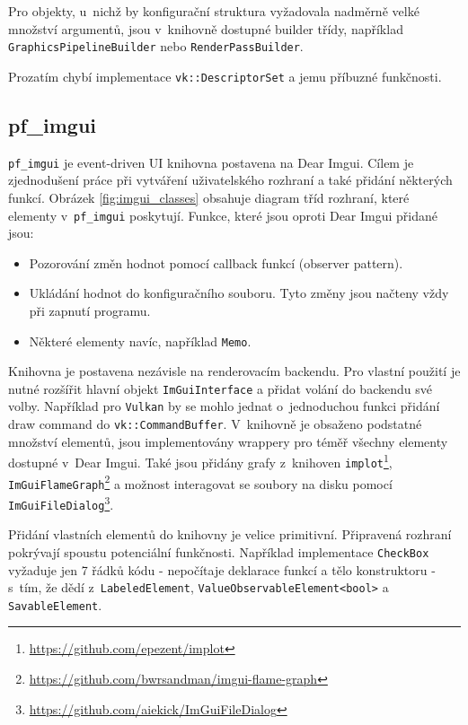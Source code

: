 Pro objekty, u~nichž by konfigurační struktura vyžadovala nadměrně velké množství argumentů, jsou v~knihovně dostupné builder třídy, například \texttt{GraphicsPipelineBuilder} nebo \texttt{RenderPassBuilder}.

Prozatím chybí implementace \texttt{vk::DescriptorSet} a jemu příbuzné funkčnosti.


\subsection{pf\_imgui}
\texttt{pf\_imgui} je event-driven UI knihovna postavena na Dear Imgui. Cílem je zjednodušení práce při vytváření uživatelského rozhraní a také přidání některých funkcí. Obrázek \ref{fig:imgui_classes} obsahuje diagram tříd rozhraní, které elementy v~\texttt{pf\_imgui} poskytují. Funkce, které jsou oproti Dear Imgui přidané jsou:

\begin{itemize}
	\item Pozorování změn hodnot pomocí callback funkcí (observer pattern).
	\item Ukládání hodnot do konfiguračního souboru. Tyto změny jsou načteny vždy při zapnutí programu.
	\item Některé elementy navíc, například \texttt{Memo}.
\end{itemize}

Knihovna je postavena nezávisle na renderovacím backendu. Pro vlastní použití je nutné rozšířit hlavní objekt \texttt{ImGuiInterface} a přidat volání do backendu své volby. Například pro \texttt{Vulkan} by se mohlo jednat o~jednoduchou funkci přidání draw command do \texttt{vk::CommandBuffer}. V~knihovně je obsaženo podstatné množství elementů, jsou implementovány wrappery pro téměř všechny elementy dostupné v~Dear Imgui. Také jsou přidány grafy z~knihoven \texttt{implot}\footnote{\url{https://github.com/epezent/implot}}, \texttt{ImGuiFlameGraph}\footnote{\url{https://github.com/bwrsandman/imgui-flame-graph}} a možnost interagovat se soubory na disku pomocí \texttt{ImGuiFileDialog}\footnote{\url{https://github.com/aiekick/ImGuiFileDialog}}.

Přidání vlastních elementů do knihovny je velice primitivní. Připravená rozhraní pokrývají spoustu potenciální funkčnosti. Například implementace \texttt{CheckBox} vyžaduje jen 7 řádků kódu - nepočítaje deklarace funkcí a tělo konstruktoru - s~tím, že dědí z~\texttt{LabeledElement}, \texttt{ValueObservableElement<bool>} a \texttt{SavableElement}.

